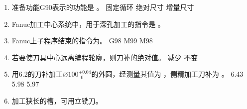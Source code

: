 \documentclass[12pt,twocolumn,landscape,UTF8,twoside]{ctexart}
\begin{document}
\begin{spacing}{1.3}
\begin{enumerate} [1、]
\item 准备功能G90表示的功能是	。
	{固定循环}	{绝对尺寸}	{增量尺寸}
\item Fanuc加工中心系统中，用于深孔加工的指令是		。
\item Fanuc上子程序结束的指令为。
	{G98}	{M99}	{M98}
\item 若要使刀具中心远离编程轮廓，则刀补的绝对值。
	{减少}	{不变}	
\item 用6.2的刀补加工$\diameter 100^{+0.04}_{~\; 0}$的外圆，经测量其值为 ，侧精加工刀补为	。
	{6.43}	{5.98}	{5.97}
\item 加工狭长的槽，可用立铣刀。


\end{enumerate}
\end{spacing}
\end{document}
